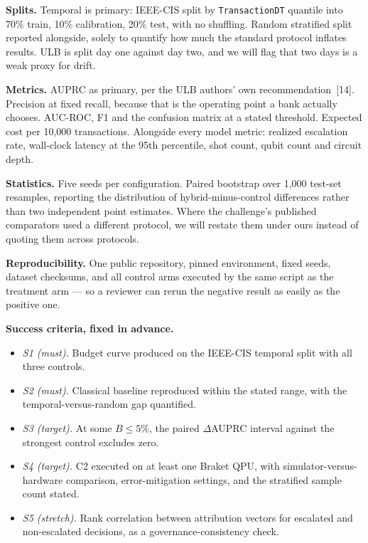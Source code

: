 \documentclass[10pt,a4paper]{article}
\begin{document}
\textbf{Splits.} Temporal is primary: IEEE-CIS split by \texttt{TransactionDT} quantile into 70\% train, 10\% calibration, 20\% test, with no shuffling. Random stratified split reported alongside, solely to quantify how much the standard protocol inflates results. ULB is split day one against day two, and we will flag that two days is a weak proxy for drift.

\textbf{Metrics.} AUPRC as primary, per the ULB authors' own recommendation~[14]. Precision at fixed recall, because that is the operating point a bank actually chooses. AUC-ROC, F1 and the confusion matrix at a stated threshold. Expected cost per 10{,}000 transactions. Alongside every model metric: realized escalation rate, wall-clock latency at the 95th percentile, shot count, qubit count and circuit depth.

\textbf{Statistics.} Five seeds per configuration. Paired bootstrap over 1{,}000 test-set resamples, reporting the distribution of hybrid-minus-control differences rather than two independent point estimates. Where the challenge's published comparators used a different protocol, we will restate them under ours instead of quoting them across protocols.

\textbf{Reproducibility.} One public repository, pinned environment, fixed seeds, dataset checksums, and all control arms executed by the same script as the treatment arm --- so a reviewer can rerun the negative result as easily as the positive one.

\textbf{Success criteria, fixed in advance.}

\begin{itemize}
\item \emph{S1 (must).} Budget curve produced on the IEEE-CIS temporal split with all three controls.
\item \emph{S2 (must).} Classical baseline reproduced within the stated range, with the temporal-versus-random gap quantified.
\item \emph{S3 (target).} At some $B \leq 5\%$, the paired $\Delta$AUPRC interval against the strongest control excludes zero.
\item \emph{S4 (target).} C2 executed on at least one Braket QPU, with simulator-versus-hardware comparison, error-mitigation settings, and the stratified sample count stated.
\item \emph{S5 (stretch).} Rank correlation between attribution vectors for escalated and non-escalated decisions, as a governance-consistency check.
\end{itemize}
\end{document}
